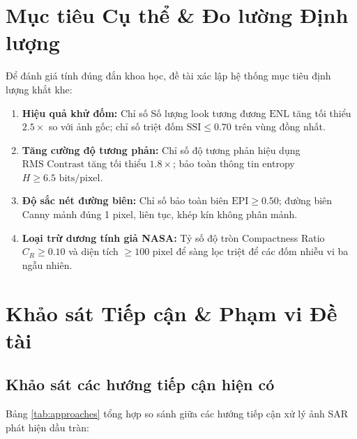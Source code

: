 \section{Mục tiêu Cụ thể \& Đo lường Định lượng}
Để đánh giá tính đúng đắn khoa học, đề tài xác lập hệ thống mục tiêu định lượng khắt khe:
\begin{enumerate}
    \item \textbf{Hiệu quả khử đốm:} Chỉ số Số lượng look tương đương $\text{ENL}$ tăng tối thiểu $2.5\times$ so với ảnh gốc; chỉ số triệt đốm $\text{SSI} \le 0.70$ trên vùng đồng nhất.
    \item \textbf{Tăng cường độ tương phản:} Chỉ số độ tương phản hiệu dụng $\text{RMS Contrast}$ tăng tối thiểu $1.8\times$; bảo toàn thông tin entropy $H \ge 6.5\text{ bits/pixel}$.
    \item \textbf{Độ sắc nét đường biên:} Chỉ số bảo toàn biên $\text{EPI} \ge 0.50$; đường biên Canny mảnh đúng 1 pixel, liên tục, khép kín không phân mảnh.
    \item \textbf{Loại trừ dương tính giả NASA:} Tỷ số độ tròn Compactness Ratio $C_R \ge 0.10$ và diện tích $\ge 100\text{ pixel}$ để sàng lọc triệt để các đốm nhiễu vi ba ngẫu nhiên.
\end{enumerate}



\section{Khảo sát Tiếp cận \& Phạm vi Đề tài}
\subsection{Khảo sát các hướng tiếp cận hiện có}
Bảng \ref{tab:approaches} tổng hợp so sánh giữa các hướng tiếp cận xử lý ảnh SAR phát hiện dầu tràn:

